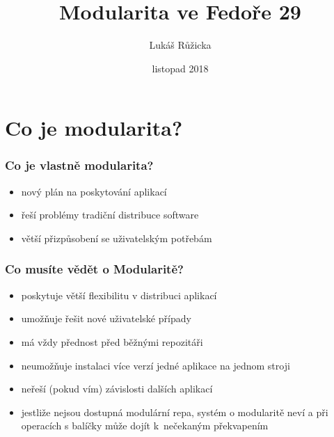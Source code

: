 \documentclass[12pt]{beamer}
\begin{document}
	\author{Lukáš Růžicka}
	\title{Modularita ve Fedoře 29}
	\subtitle{}
	\date{listopad 2018}
	\subject{Fedora 29}
	\begin{frame}[plain]
	\maketitle
\end{frame}

\section{Co je modularita?}

\begin{frame}
\frametitle{Co je vlastně modularita?}

\begin{itemize}
	\item nový plán na poskytování aplikací
	\item řeší problémy tradiční distribuce software
	\item větší přizpůsobení se uživatelským potřebám
\end{itemize}
\end{frame}

\begin{frame}
\frametitle{Co musíte vědět o Modularitě?}

\begin{itemize}
	\item poskytuje větší flexibilitu v distribuci aplikací
	\item umožňuje řešit nové uživatelské případy
	\item má vždy přednost před běžnými repozitáři
	\item neumožňuje instalaci více verzí jedné aplikace na jednom stroji
	\item neřeší (pokud vím) závislosti dalších aplikací
	\item jestliže nejsou dostupná modulární repa, systém o modularitě neví a při operacích s balíčky může dojít k~nečekaným překvapením 
\end{itemize}
\end{frame}
\end{document}

